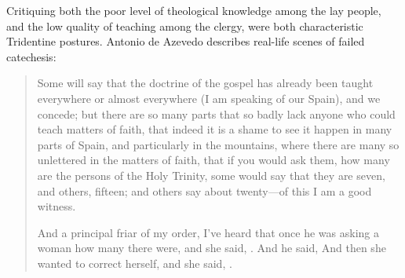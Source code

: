 Critiquing both the poor level of theological knowledge among the lay people, and the low quality of teaching among the clergy, were both characteristic Tridentine postures.
Antonio de Azevedo describes real-life scenes of failed catechesis:
\begin{quotation}
    Some will say that the doctrine of the gospel has already been taught everywhere or almost everywhere (I am speaking of our Spain), and we concede;
    but there are so many parts that so badly lack anyone who could teach matters of faith,
    that indeed it is a shame to see it happen in many parts of Spain, and particularly in the  mountains,
    where there are many so unlettered  in the matters of faith,
    that if you would ask them, how many are the persons of the Holy Trinity, some would say that they are seven, and others, fifteen; and others say about twenty---of this I am a good witness.

    And a principal friar of my order, I've heard that once he was asking a woman how many  there were, and she said, .
    And he said, 
    And then she wanted to correct herself, and she said, .%
        \Autocite[26: .]
        {Azevedo:Catecismo}
\end{quotation}

